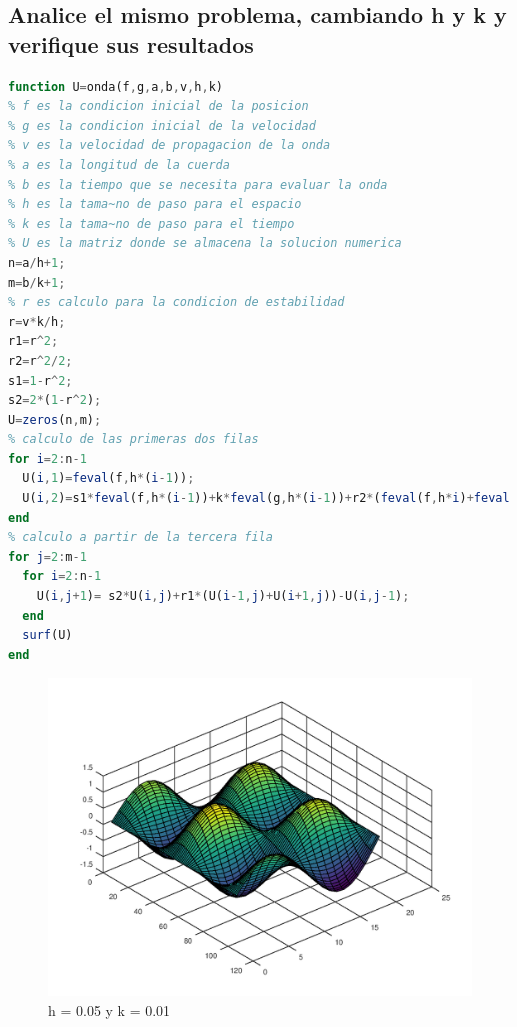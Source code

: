\documentclass{article}
\begin{document}
\subsection{Analice el mismo problema, cambiando h y k y verifique sus resultados}
\begin{lstlisting}[language=Octave, caption=Código base de la ecuacion de la onda,label=lst:ondaFirst]
function U=onda(f,g,a,b,v,h,k)
% f es la condicion inicial de la posicion
% g es la condicion inicial de la velocidad
% v es la velocidad de propagacion de la onda
% a es la longitud de la cuerda
% b es la tiempo que se necesita para evaluar la onda
% h es la tama~no de paso para el espacio
% k es la tama~no de paso para el tiempo
% U es la matriz donde se almacena la solucion numerica
n=a/h+1;
m=b/k+1;
% r es calculo para la condicion de estabilidad
r=v*k/h;
r1=r^2;
r2=r^2/2;
s1=1-r^2;
s2=2*(1-r^2);
U=zeros(n,m);
% calculo de las primeras dos filas
for i=2:n-1
  U(i,1)=feval(f,h*(i-1));
  U(i,2)=s1*feval(f,h*(i-1))+k*feval(g,h*(i-1))+r2*(feval(f,h*i)+feval(f,h*(i-2)));
end
% calculo a partir de la tercera fila
for j=2:m-1
  for i=2:n-1
    U(i,j+1)= s2*U(i,j)+r1*(U(i-1,j)+U(i+1,j))-U(i,j-1);
  end
  surf(U)
end
\end{lstlisting}
\begin{figure}[H]
    \centering
    \includegraphics[scale=0.7]{1_1.png}
    \caption{h = 0.05 y k = 0.01}
    \label{fig:Solucion Real}
\end{figure}
\end{document}
